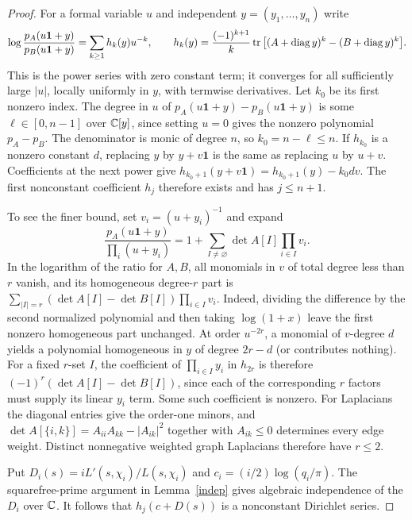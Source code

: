 \begin{proof}
For a formal variable $u$ and independent $y=(y_1,\ldots,y_n)$ write
\begin{equation}\label{eq:coupling-logexp}
 \log\frac{p_A(u\mathbf1+y)}{p_B(u\mathbf1+y)}
 =\sum_{k\ge1}h_k(y)u^{-k},\qquad
 h_k(y)=\frac{(-1)^{k+1}}k
 \operatorname{tr}\big[(A+\operatorname{diag} y)^k-(B+\operatorname{diag} y)^k\big].
\end{equation}
This is the power series with zero constant term; it converges for all
sufficiently large $|u|$, locally uniformly in $y$, with termwise
derivatives. Let $k_0$ be its first nonzero index. The degree in $u$ of
$p_A(u\mathbf1+y)-p_B(u\mathbf1+y)$ is some $\ell\in[0,n-1]$ over
$\mathbb C[y]$, since setting $u=0$ gives the nonzero polynomial $p_A-p_B$.
The denominator is monic of degree $n$, so $k_0=n-\ell\le n$. If
$h_{k_0}$ is a nonzero constant $d$, replacing $y$ by $y+v\mathbf1$
is the same as replacing $u$ by $u+v$. Coefficients at the next power give
$h_{k_0+1}(y+v\mathbf1)=h_{k_0+1}(y)-k_0dv$.
The first nonconstant coefficient $h_j$ therefore exists and has
$j\le n+1$.

To see the finer bound, set $v_i=(u+y_i)^{-1}$ and expand
\[
 \frac{p_A(u\mathbf1+y)}{\prod_i(u+y_i)}
   =1+\sum_{I\ne\varnothing}\det A[I]\prod_{i\in I}v_i.
\]
In the logarithm of the ratio for $A,B$, all monomials in $v$ of total
degree less than $r$ vanish, and its homogeneous degree-$r$ part is
$\sum_{|I|=r}(\det A[I]-\det B[I])\prod_{i\in I}v_i$. Indeed,
dividing the difference by the second normalized polynomial and then
taking $\log(1+x)$ leave the first nonzero homogeneous part unchanged.
At order $u^{-2r}$, a monomial of $v$-degree $d$ yields a polynomial
homogeneous in $y$ of degree $2r-d$ (or contributes nothing). For
a fixed $r$-set $I$, the coefficient of $\prod_{i\in I} y_i$ in
$h_{2r}$ is therefore
$(-1)^r(\det A[I]-\det B[I])$, since each of the corresponding $r$
factors must supply its linear $y_i$ term. Some such coefficient
is nonzero. For Laplacians the diagonal entries give the order-one
minors, and $\det A[\{i,k\}]=A_{ii}A_{kk}-|A_{ik}|^2$ together
with $A_{ik}\le0$ determines every edge weight. Distinct
nonnegative weighted graph Laplacians therefore have $r\le2$.

Put $D_i(s)=iL'(s,\chi_i)/L(s,\chi_i)$ and
$c_i=(i/2)\log(q_i/\pi)$. The squarefree-prime argument in
Lemma~\ref{indep} gives algebraic independence of the $D_i$ over $\mathbb C$.
It follows that $h_j(c+D(s))$ is a nonconstant Dirichlet series.


\end{proof}
